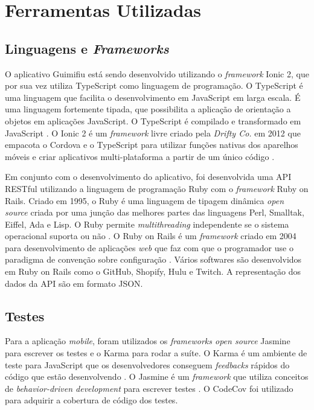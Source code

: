 \section{Ferramentas Utilizadas}

\subsection{Linguagens e \textit{Frameworks}}

O aplicativo Guimifiu está sendo desenvolvido utilizando o \textit{framework} Ionic 2, que por sua vez utiliza TypeScript como linguagem de programação. O TypeScript é uma linguagem que facilita o desenvolvimento em JavaScript em larga escala. É uma linguagem fortemente tipada, que possibilita a aplicação de orientação a objetos em aplicações JavaScript. O TypeScript é compilado e transformado em JavaScript \cite{typescript}. O Ionic 2 é um \textit{framework} livre criado pela \textit{Drifty Co.} em 2012 que empacota o Cordova e o TypeScript para utilizar funções nativas dos aparelhos móveis e criar aplicativos multi-plataforma a partir de um único código \cite{ionic-2}.

Em conjunto com o desenvolvimento do aplicativo, foi desenvolvida uma API RESTful utilizando a linguagem de programação Ruby com o \textit{framework} Ruby on Rails. Criado em 1995, o Ruby é uma linguagem de tipagem dinâmica \textit{open source} criada por uma junção das melhores partes das linguagens Perl, Smalltak, Eiffel, Ada e Lisp. O Ruby permite \textit{multithreading} independente se o sistema operacional suporta ou não \cite{ruby-wow}. O Ruby on Rails é um \textit{framework} criado em 2004 para desenvolvimento de aplicações \textit{web} que faz com que o programador use o paradigma de convenção sobre configuração \cite{rails}. Vários softwares são desenvolvidos em Ruby on Rails como o GitHub, Shopify, Hulu e Twitch. A representação dos dados da API são em formato JSON.

\subsection{Testes}

Para a aplicação \textit{mobile}, foram utilizados os \textit{frameworks open source} Jasmine para escrever os testes e o Karma para rodar a suíte. O Karma é um ambiente de teste para JavaScript que os desenvolvedores conseguem \textit{feedbacks} rápidos do código que estão desenvolvendo \cite{karma}. O Jasmine é um \textit{framework} que utiliza conceitos de \textit{behavior-driven development} para escrever testes \cite{jasmine}. O CodeCov foi utilizado para adquirir a cobertura de código dos testes.


